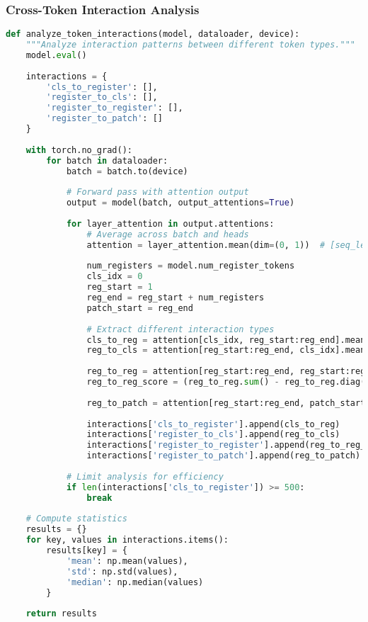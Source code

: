 \subsubsection{Cross-Token Interaction Analysis}

\begin{lstlisting}[language=Python, caption=Analyzing interactions between register and other tokens]
def analyze_token_interactions(model, dataloader, device):
    """Analyze interaction patterns between different token types."""
    model.eval()
    
    interactions = {
        'cls_to_register': [],
        'register_to_cls': [],
        'register_to_register': [],
        'register_to_patch': []
    }
    
    with torch.no_grad():
        for batch in dataloader:
            batch = batch.to(device)
            
            # Forward pass with attention output
            output = model(batch, output_attentions=True)
            
            for layer_attention in output.attentions:
                # Average across batch and heads
                attention = layer_attention.mean(dim=(0, 1))  # [seq_len, seq_len]
                
                num_registers = model.num_register_tokens
                cls_idx = 0
                reg_start = 1
                reg_end = reg_start + num_registers
                patch_start = reg_end
                
                # Extract different interaction types
                cls_to_reg = attention[cls_idx, reg_start:reg_end].mean().item()
                reg_to_cls = attention[reg_start:reg_end, cls_idx].mean().item()
                
                reg_to_reg = attention[reg_start:reg_end, reg_start:reg_end]
                reg_to_reg_score = (reg_to_reg.sum() - reg_to_reg.diag().sum()) / (num_registers * (num_registers - 1))
                
                reg_to_patch = attention[reg_start:reg_end, patch_start:].mean().item()
                
                interactions['cls_to_register'].append(cls_to_reg)
                interactions['register_to_cls'].append(reg_to_cls)
                interactions['register_to_register'].append(reg_to_reg_score.item())
                interactions['register_to_patch'].append(reg_to_patch)
            
            # Limit analysis for efficiency
            if len(interactions['cls_to_register']) >= 500:
                break
    
    # Compute statistics
    results = {}
    for key, values in interactions.items():
        results[key] = {
            'mean': np.mean(values),
            'std': np.std(values),
            'median': np.median(values)
        }
    
    return results
\end{lstlisting}

